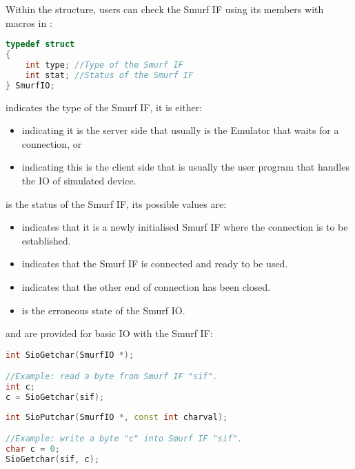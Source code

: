 Within the  structure, users can check the Smurf IF using its members with macros in :
\begin{lstlisting}[language=C++, caption={struct SmurfIO\label{api:SmurfIOC}}]
typedef struct 
{
	int type; //Type of the Smurf IF
	int stat; //Status of the Smurf IF
} SmurfIO;
\end{lstlisting}

 indicates the type of the Smurf IF, it is either:
\begin{itemize}
	\item {} indicating it is the server side that usually is the Emulator that waits for a connection, or
	\item {} indicating this is the client side that is usually the user program that handles the IO of simulated device.
\end{itemize}

 is the status of the Smurf IF, its possible values are:
\begin{itemize}
	\item {} indicates that it is a newly initialised Smurf IF where the connection is to be established.
	\item {} indicates that the Smurf IF is connected and ready to be used.
	\item {} indicates that the other end of connection has been closed.
	\item {} is the erroneous state of the Smurf IO.
\end{itemize}

 and  are provided for basic IO with the Smurf IF:
\begin{lstlisting}[language=C++, caption={SioGetchar()\label{api:SioGetcharC}}]
int SioGetchar(SmurfIO *);

//Example: read a byte from Smurf IF "sif".
int c;
c = SioGetchar(sif);
\end{lstlisting}

\begin{lstlisting}[language=C++, caption={SioPutchar()\label{api:SioPutcharC}}]
int SioPutchar(SmurfIO *, const int charval);

//Example: write a byte "c" into Smurf IF "sif".
char c = 0;
SioGetchar(sif, c);
\end{lstlisting}

